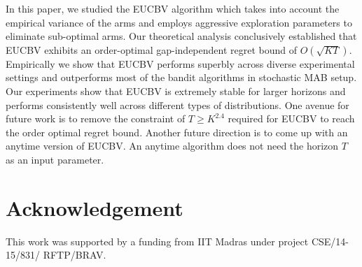 In this paper, we studied the EUCBV algorithm which takes into account the empirical variance of the arms and employs aggressive exploration parameters to eliminate sub-optimal arms. Our theoretical analysis conclusively established that EUCBV exhibits an order-optimal gap-independent regret bound of $O\left(\sqrt{KT}\right)$. Empirically we show that EUCBV performs superbly across diverse experimental settings and outperforms most of the bandit algorithms in stochastic  MAB setup. Our experiments show that EUCBV is extremely stable for larger horizons and performs consistently well across different types of distributions. One avenue for future work is to remove the constraint of $T\geq K^{2.4}$ required for EUCBV to reach the order optimal regret bound. Another future direction is to come up with an anytime version of EUCBV. An anytime algorithm does not need the horizon $T$ as an input parameter.


\section*{Acknowledgement} This work was supported by a funding from IIT Madras under project CSE/14-15/831/ RFTP/BRAV.